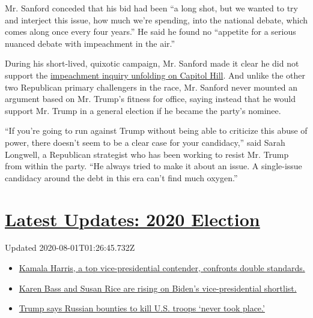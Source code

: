 Mr. Sanford conceded that his bid had been ``a long shot, but we wanted
to try and interject this issue, how much we're spending, into the
national debate, which comes along once every four years.'' He said he
found no ``appetite for a serious nuanced debate with impeachment in the
air.''

During his short-lived, quixotic campaign, Mr. Sanford made it clear he
did not support the
\href{https://www.nytimes.com/2019/11/12/us/politics/impeachment-strategy-republicans.html}{impeachment
inquiry unfolding on Capitol Hill}. And unlike the other two Republican
primary challengers in the race, Mr. Sanford never mounted an argument
based on Mr. Trump's fitness for office, saying instead that he would
support Mr. Trump in a general election if he became the party's
nominee.

``If you're going to run against Trump without being able to criticize
this abuse of power, there doesn't seem to be a clear case for your
candidacy,'' said Sarah Longwell, a Republican strategist who has been
working to resist Mr. Trump from within the party. ``He always tried to
make it about an issue. A single-issue candidacy around the debt in this
era can't find much oxygen.''

\hypertarget{latest-updates-2020-election}{%
\section{\texorpdfstring{\href{https://www.nytimes.com/2020/07/31/us/elections/biden-vs-trump.html?action=click\&pgtype=Article\&state=default\&region=MAIN_CONTENT_1\&context=storylines_live_updates}{Latest
Updates: 2020
Election}}{Latest Updates: 2020 Election}}\label{latest-updates-2020-election}}

Updated 2020-08-01T01:26:45.732Z

\begin{itemize}
\tightlist
\item
  \href{https://www.nytimes.com/2020/07/31/us/elections/biden-vs-trump.html?action=click\&pgtype=Article\&state=default\&region=MAIN_CONTENT_1\&context=storylines_live_updates\#link-29fdff45}{Kamala
  Harris, a top vice-presidential contender, confronts double
  standards.}
\item
  \href{https://www.nytimes.com/2020/07/31/us/elections/biden-vs-trump.html?action=click\&pgtype=Article\&state=default\&region=MAIN_CONTENT_1\&context=storylines_live_updates\#link-13ec3d9c}{Karen
  Bass and Susan Rice are rising on Biden's vice-presidential
  shortlist.}
\item
  \href{https://www.nytimes.com/2020/07/31/us/elections/biden-vs-trump.html?action=click\&pgtype=Article\&state=default\&region=MAIN_CONTENT_1\&context=storylines_live_updates\#link-49e9a016}{Trump
  says Russian bounties to kill U.S. troops `never took place.'}
\end{itemize}

